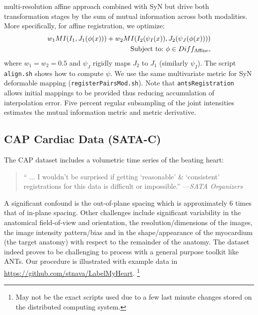 \documentclass{llncs}
\begin{document}
multi-resolution affine approach combined with SyN but drive both
transformation stages by the sum of mutual information across both
modalities.  More specifically, for affine registration, we optimize:
\begin{eqnarray}
w_1 MI(  I_1 , J_1( \phi(x) ) ) +
w_2 MI(  I_2(\psi_I(x)) , J_2( \psi_J(\phi(x)) ) ) \notag \\ 
\text{Subject to:}~\phi \in Diff_\text{Affine},
\end{eqnarray}
where $w_1=w_2=0.5$ and $\psi_J$ rigidly maps $J_2$ to $J_1$
(similarly $\psi_I$).  The script \texttt{align.sh} shows how to
compute $\psi$.  We use the same multivariate metric for SyN deformable mapping (\texttt{registerPairsMod.sh}).  Note that
\texttt{antsRegistration} allows initial mappings to be provided thus
reducing accumulation of interpolation error.  Five percent regular
subsampling of the joint intensities estimates the mutual information
metric and metric derivative.

\subsection{CAP Cardiac Data (SATA-C)}
The CAP dataset includes a volumetric time series of the beating heart:
 \begin{quote}
  `` ... I wouldn't be surprised if getting `reasonable' \& `consistent' registrations for this data is difficult or impossible.'' ---{\em SATA Organizers}
\end{quote}
\noindent A significant confound is the out-of-plane spacing which is
approximately 6 times that of in-plane spacing.  Other challenges
include significant variability in the anatomical field-of-view and
orientation, the resolution/dimensions of the images, the image
intensity pattern/bias and in the shape/appearance of the myocardium
(the target anatomy) with respect to the remainder of the anatomy.
The dataset indeed proves to be challenging to process with a general
purpose toolkit like ANTs.  Our procedure is illustrated with example
data in \url{https://github.com/stnava/LabelMyHeart}. \footnote{May
not be the exact scripts used due to a few last minute changes stored
on the distributed computing system.}
\end{document}
